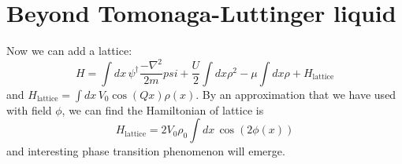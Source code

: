 \documentclass{article}
\begin{document}
\section{Beyond Tomonaga-Luttinger liquid}
Now we can add a lattice:
$$
H = \int dx\, \psi^\dagger\frac{-\nabla^2}{2m}psi+\frac{U}{2}\int dx \rho^2-\mu\int dx\rho+H_\mathrm{lattice}
$$
and $H_{\mathrm{lattice}}=\int dx\,V_0 \cos{(Qx)}\rho(x)$. By an approximation that we have used with field $\phi$, we can find the Hamiltonian of lattice is $$
H_{\mathrm{lattice}}=2V_0\rho_0\int dx\, \cos(2\phi(x))
$$
and interesting phase transition phenomenon will emerge.
\end{document}
